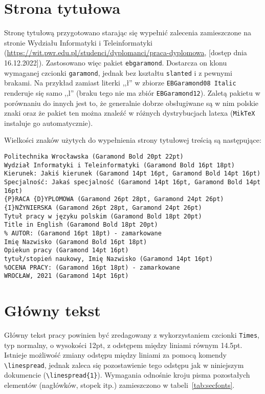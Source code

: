 \section{Strona tytułowa}
Stronę tytułową przygotowano starając się wypełnić zalecenia zamieszczone na stronie Wydziału Informatyki i Teleinformatyki (\url{https://wit.pwr.edu.pl/studenci/dyplomanci/praca-dyplomowa}, [dostęp dnia 16.12.2022]). Zastosowano więc pakiet \texttt{ebgaramond}. Dostarcza on klonu wymaganej czcionki \texttt{garamond}, jednak bez kształtu \texttt{slanted} i z pewnymi brakami. Na przykład zamiast literki ,,ł'' w zbiorze \texttt{EBGaramond08 Italic} renderuje się samo ,,l'' (braku tego nie ma zbiór \texttt{EBGaramond12}).  Zaletą pakietu  w porównaniu do innych jest to, że generalnie dobrze obsługiwane są w nim polskie znaki oraz że pakiet ten można znaleźć w różnych dystrybucjach latexa (\texttt{MikTeX} instaluje go automatycznie).

Wielkości znaków użytych do wypełnienia strony tytułowej treścią są następujące:
\begin{lstlisting}[basicstyle=\footnotesize\ttfamily]
Politechnika Wrocławska (Garamond Bold 20pt 22pt)
Wydział Informatyki i Teleinformatyki (Garamond Bold 16pt 18pt)
Kierunek: Jakiś kierunek (Garamond 14pt 16pt, Garamond Bold 14pt 16pt)
Specjalność: Jakaś specjalność (Garamond 14pt 16pt, Garamond Bold 14pt 16pt)
{P}RACA {D}YPLOMOWA (Garamond 26pt 28pt, Garamond 24pt 26pt)
{I}NŻYNIERSKA (Garamond 26pt 28pt, Garamond 24pt 26pt)
Tytuł pracy w języku polskim (Garamond Bold 18pt 20pt)
Title in English (Garamond Bold 18pt 20pt)
% AUTOR: (Garamond 16pt 18pt) - zamarkowane
Imię Nazwisko (Garamond Bold 16pt 18pt)
Opiekun pracy (Garamond 14pt 16pt)
tytuł/stopień naukowy, Imię Nazwisko (Garamond 14pt 16pt)
%OCENA PRACY: (Garamond 16pt 18pt) - zamarkowane
WROCŁAW, 2021 (Garamond 14pt 16pt)
\end{lstlisting}


\section{Główny tekst}
Główny tekst pracy powinien być zredagowany z wykorzystaniem czcionki \texttt{Times}, typ normalny, o wysokości 12pt, z odstępem między liniami równym 14.5pt. Istnieje możliwość zmiany odstępu między liniami za pomocą komendy \verb?\linespread?, jednak zaleca się pozostawienie tego odstępu jak w niniejszym dokumencie (\verb?\linespread{1}?). Wymagania odnośnie kroju pisma pozostałych elementów (nagłówków, stopek itp.) zamieszczono w tabeli~\ref{tab:secfonts}.

